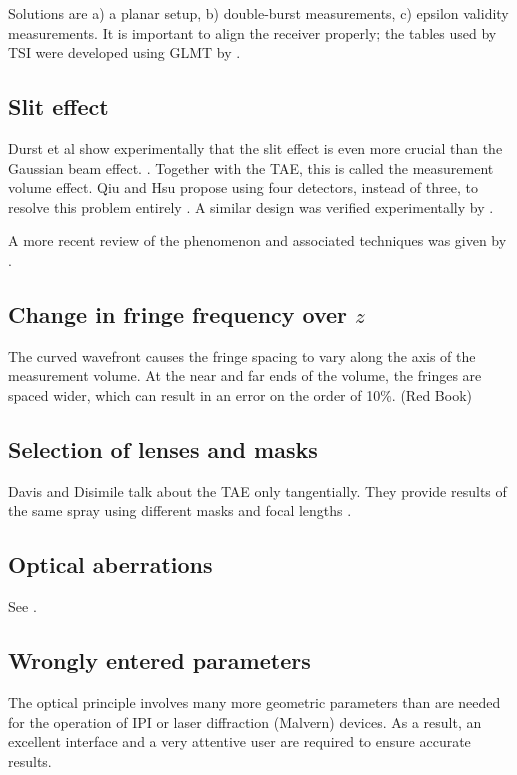 \documentclass[10pt]{book}
\begin{document}
Solutions are a) a planar setup, b) double-burst measurements, c) epsilon
validity measurements. It is important to align the receiver properly; the
tables used by TSI were developed using GLMT by \citet{Naqwi96}.

\subsection{Slit effect}
Durst et al show experimentally that the slit effect is even more crucial than
the Gaussian beam effect. \cite{Durst94}. Together with the TAE, this
is called the measurement volume effect. Qiu and Hsu propose using four
detectors, instead of three, to resolve this problem entirely \cite{Qiu99}. A
similar design was verified experimentally by \citet{Sipperley14}.

A more recent review of the phenomenon and associated techniques was given by
\citet{Strakey00, Strakey01}.

\subsection{Change in fringe frequency over $z$}
The curved wavefront causes the fringe spacing to vary along the axis of the
measurement volume. At the near and far ends of the volume, the fringes are
spaced wider, which can result in an error on the order of 10\%. (Red Book)

\subsection{Selection of lenses and masks}
Davis and Disimile talk about the TAE only tangentially. They provide results of
the same spray using different masks and focal lengths \cite{Davis04}.

\subsection{Optical aberrations}
See \citet{Dressler90}.

\subsection{Wrongly entered parameters}
The optical principle involves many more geometric parameters than are needed
for the operation of IPI or laser diffraction (Malvern) devices. As a result, an
excellent interface and a very attentive user are required to ensure accurate
results.
\end{document}
